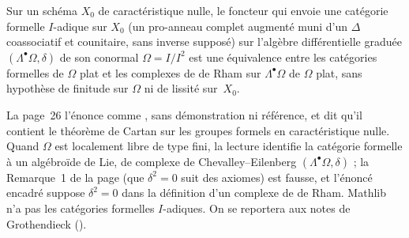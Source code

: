 \begin{encadre}
\begin{theoreme*}\nonverifie
Sur un schéma $X_0$ de caractéristique nulle, le foncteur qui envoie une catégorie formelle $I$-adique sur $X_0$ (un pro-anneau complet augmenté muni d'un $\Delta$ coassociatif et counitaire, sans inverse supposé) sur l'algèbre différentielle graduée $(\Lambda^\bullet\Omega, \delta)$ de son conormal $\Omega = I/I^2$ est une équivalence entre les catégories formelles de $\Omega$ plat et les complexes de de Rham sur $\Lambda^\bullet\Omega$ de $\Omega$ plat, sans hypothèse de finitude sur $\Omega$ ni de lissité sur~$X_0$.
\end{theoreme*}
\end{encadre}
{\small La page~26 l'énonce comme , sans démonstration ni référence, et dit qu'il contient le théorème de Cartan sur les groupes formels en caractéristique nulle. Quand $\Omega$ est localement libre de type fini, la lecture identifie la catégorie formelle à un algébroïde de Lie, de complexe de Chevalley--Eilenberg $(\Lambda^\bullet\Omega, \delta)$ ; la Remarque~1 de la page (que $\delta^2 = 0$ suit des axiomes) est fausse, et l'énoncé encadré suppose $\delta^2 = 0$ dans la définition d'un complexe de de Rham. Mathlib n'a pas les catégories formelles $I$-adiques. On se reportera aux notes de Grothendieck ().\par}
